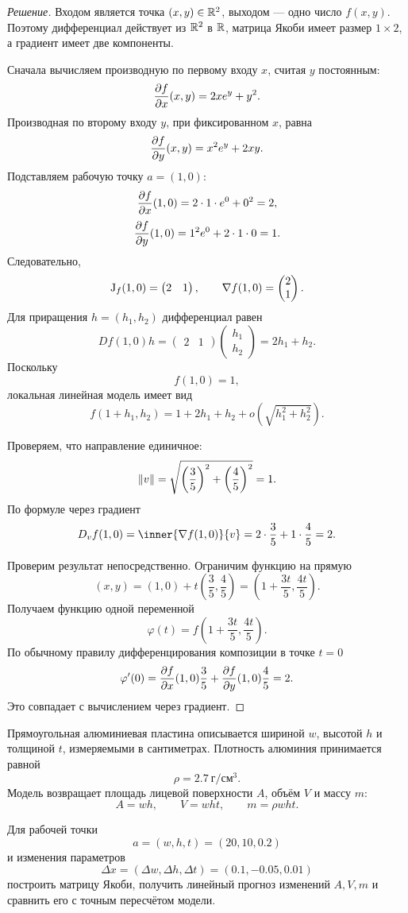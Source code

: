 \begin{proof}[Решение]
Входом является точка \((x,y)\in\mathbb{R}^2\), выходом --- одно число \(f(x,y)\). Поэтому дифференциал действует из \(\mathbb{R}^2\) в \(\mathbb{R}\), матрица Якоби имеет размер \(1\times2\), а градиент имеет две компоненты.

Сначала вычисляем производную по первому входу \(x\), считая \(y\) постоянным:
\[
\frac{\partial f}{\partial x}(x,y)
=
2xe^y+y^2.
\]
Производная по второму входу \(y\), при фиксированном \(x\), равна
\[
\frac{\partial f}{\partial y}(x,y)
=
x^2e^y+2xy.
\]
Подставляем рабочую точку \(a=(1,0)\):
\[
\frac{\partial f}{\partial x}(1,0)
=
2\cdot1\cdot e^0+0^2
=2,
\]
\[
\frac{\partial f}{\partial y}(1,0)
=
1^2e^0+2\cdot1\cdot0
=1.
\]
Следовательно,
\[
\mathrm{J}_{f}(1,0)
=
\begin{pmatrix}2&1\end{pmatrix},
\qquad
\nabla f(1,0)
=
\begin{pmatrix}2\\1\end{pmatrix}.
\]
Для приращения \(h=(h_1,h_2)\) дифференциал равен
\[
Df(1,0)h
=
\begin{pmatrix}2&1\end{pmatrix}
\begin{pmatrix}h_1\\h_2\end{pmatrix}
=
2h_1+h_2.
\]
Поскольку
\[
f(1,0)=1,
\]
локальная линейная модель имеет вид
\begin{equation}
 f(1+h_1,h_2)
=
1+2h_1+h_2+o\!\left(\sqrt{h_1^2+h_2^2}\right).
\label{eq:scalar-task-linearization}
\end{equation}

Проверяем, что направление единичное:
\[
\lVert v\rVert
=
\sqrt{\left(\frac35\right)^2+\left(\frac45\right)^2}
=1.
\]
По формуле через градиент
\[
D_vf(1,0)
=
\inner{\grad f(1,0)}{v}
=
2\cdot\frac35+1\cdot\frac45
=2.
\]

Проверим результат непосредственно. Ограничим функцию на прямую
\[
(x,y)
=
(1,0)+t\left(\frac35,\frac45\right)
=
\left(1+\frac{3t}{5},\frac{4t}{5}\right).
\]
Получаем функцию одной переменной
\[
\varphi(t)
=
f\left(1+\frac{3t}{5},\frac{4t}{5}\right).
\]
По обычному правилу дифференцирования композиции в точке \(t=0\)
\[
\varphi'(0)
=
\frac{\partial f}{\partial x}(1,0)\frac35
+
\frac{\partial f}{\partial y}(1,0)\frac45
=
2.
\]
Это совпадает с вычислением через градиент.
\end{proof}

\begin{problem}
Прямоугольная алюминиевая пластина описывается шириной \(w\), высотой \(h\) и толщиной \(t\), измеряемыми в сантиметрах. Плотность алюминия принимается равной
\[
\rho=2.7\ \text{г}/\text{см}^3.
\]
Модель возвращает площадь лицевой поверхности \(A\), объём \(V\) и массу \(m\):
\[
A=wh,
\qquad
V=wht,
\qquad
m=\rho wht.
\]

Для рабочей точки
\[
a=(w,h,t)=(20,10,0.2)
\]
и изменения параметров
\[
\Delta x=(\Delta w,\Delta h,\Delta t)
=(0.1,-0.05,0.01)
\]
построить матрицу Якоби, получить линейный прогноз изменений \(A,V,m\) и сравнить его с точным пересчётом модели.
\end{problem}

